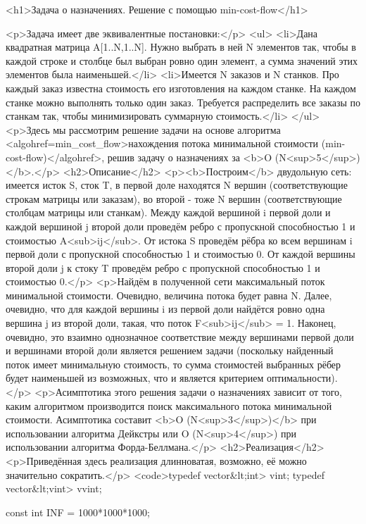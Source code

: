 <h1>Задача о назначениях. Решение с помощью min-cost-flow</h1>

<p>Задача имеет две эквивалентные постановки:</p>
<ul>
<li>Дана квадратная матрица A[1..N,1..N]. Нужно выбрать в ней N элементов так, чтобы в каждой строке и столбце был выбран ровно один элемент, а сумма значений этих элементов была наименьшей.</li>
<li>Имеется N заказов и N станков. Про каждый заказ известна стоимость его изготовления на каждом станке. На каждом станке можно выполнять только один заказ. Требуется распределить все заказы по станкам так, чтобы минимизировать суммарную стоимость.</li>
</ul>
<p>Здесь мы рассмотрим решение задачи на основе алгоритма <algohref=min_cost_flow>нахождения потока минимальной стоимости (min-cost-flow)</algohref>, решив задачу о назначениях за <b>O (N<sup>5</sup>)</b>.</p>
<h2>Описание</h2>
<p><b>Построим</b> двудольную сеть: имеется исток S, сток T, в первой доле находятся N вершин (соответствующие строкам матрицы или заказам), во второй - тоже N вершин (соответствующие столбцам матрицы или станкам). Между каждой вершиной i первой доли и каждой вершиной j второй доли проведём ребро с пропускной способностью 1 и стоимостью A<sub>ij</sub>. От истока S проведём рёбра ко всем вершинам i первой доли с пропускной способностью 1 и стоимостью 0. От каждой вершины второй доли j к стоку T проведём ребро с пропускной способностью 1 и стоимостью 0.</p>
<p>Найдём в полученной сети максимальный поток минимальной стоимости. Очевидно, величина потока будет равна N. Далее, очевидно, что для каждой вершины i из первой доли найдётся ровно одна вершина j из второй доли, такая, что поток F<sub>ij</sub> = 1. Наконец, очевидно, это взаимно однозначное соответствие между вершинами первой доли и вершинами второй доли является решением задачи (поскольку найденный поток имеет минимальную стоимость, то сумма стоимостей выбранных рёбер будет наименьшей из возможных, что и является критерием оптимальности).</p>
<p>Асимптотика этого решения задачи о назначениях зависит от того, каким алгоритмом производится поиск максимального потока минимальной стоимости. Асимптотика составит <b>O (N<sup>3</sup>)</b> при использовании алгоритма Дейкстры или O (N<sup>4</sup>) при использовании алгоритма Форда-Беллмана.</p>
<h2>Реализация</h2>
<p>Приведённая здесь реализация длинноватая, возможно, её можно значительно сократить.</p>
<code>typedef vector&lt;int> vint;
typedef vector&lt;vint> vvint;

const int INF = 1000*1000*1000;


